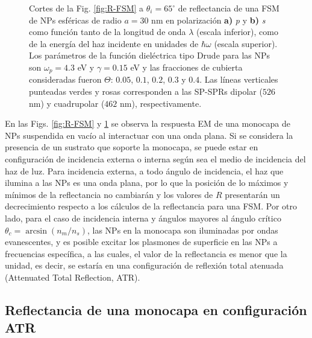 \begin{figure}[h!]
	\caption{Cortes de la Fig. \ref{fig:R-FSM} a $\theta_i = 65^\circ$ de reflectancia de una FSM de NPs esféricas de radio $a=30$ nm en polarización \textbf{a)} \emph{p} y \textbf{b)} \emph{s} como función tanto de la longitud de onda $\lambda$ (escala inferior), como de la energía del haz incidente en unidades de $\hbar\omega$ (escala superior). Los parámetros de la función dieléctrica tipo Drude para las NPs son $\omega_p = 4.3$ eV y $\gamma = 0.15$ eV y las fracciones de cubierta consideradas fueron $\Theta$: $0. 05$, $0. 1$, $0. 2$, $0. 3$ y $0. 4$. Las líneas verticales punteadas verdes y rosas corresponden a las SP-SPRs dipolar ($526$ nm) y cuadrupolar ($462$ nm), respectivamente.}\label{fig:FSM-Cuts}
	\end{figure}	

En las Figs. \ref{fig:R-FSM} y \ref{fig:FSM-Cuts} se observa la respuesta EM de una monocapa de NPs suspendida en vacío al interactuar con una onda plana. Si se considera la presencia de un sustrato que soporte la monocapa, se puede estar en configuraci\'on de incidencia externa o interna seg\'un sea el medio de incidencia del haz de luz. Para incidencia externa, a todo ángulo de incidencia,  el haz que ilumina a las NPs es una onda plana, por lo que la posición de lo máximos y mínimos de la reflectancia no cambiarán y los valores de $R$ presentarán un decrecimiento respecto a los cálculos de la reflectancia para una FSM. Por otro lado, para el caso de incidencia interna y ángulos mayores al ángulo crítico $\theta_c = \arcsin(n_m/n_s)$, las NPs en la monocapa son iluminadas por ondas evanescentes, y es posible excitar los plasmones de superficie en las NPs a frecuencias específica, a las cuales, el valor de la reflectancia es menor que la unidad, es decir, se estaría en una configuración de reflexión total atenuada (Attenuated Total Reflection, ATR).

	\subsection{Reflectancia de una monocapa en configuración ATR}

